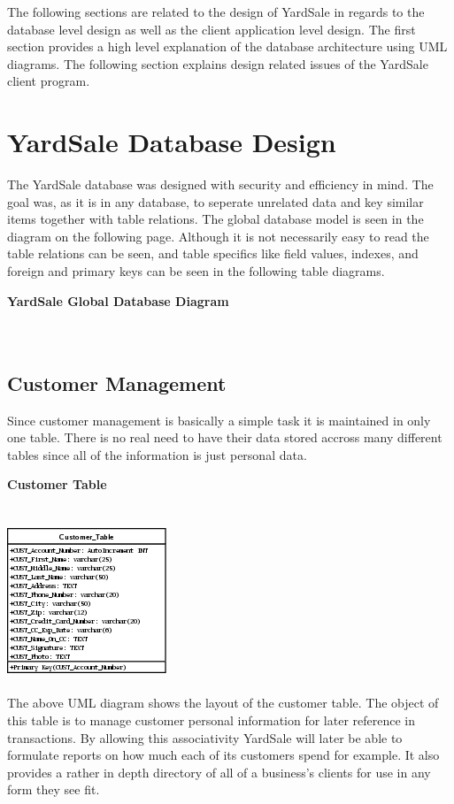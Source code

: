 \documentclass{report}
\begin{document}
	The following sections are related to the design of YardSale
	in regards to the database level design as well as the client
	application level design. The first section provides a high level
	explanation of the database architecture using UML diagrams. The
	following section explains design related issues of the YardSale
	client program.

\section{YardSale Database Design}

	The YardSale database was designed with security and efficiency in
	mind. The goal was, as it is in any database, to seperate unrelated
	data and key similar items together with table relations. The global
	database model is seen in the diagram on the following page. Although
	it is not necessarily easy to read the table relations can be seen, and
	table specifics like field values, indexes, and foreign and primary keys
	can be seen in the following table diagrams.

	\newpage

	{\bf YardSale Global Database Diagram}\\
	\\
	\\

	\newpage

	\subsection{Customer Management}

	Since customer management is basically a simple task it is maintained in only
	one table. There is no real need to have their data stored accross many
	different tables since all of the information is just personal data.

	{\bf Customer Table}\\
	\\
	\\
	\includegraphics{Tables/CustomerTable.png}\\
	\\
	The above UML diagram shows the layout of the customer table. The object of this
	table is to manage customer personal information for later reference in
	transactions. By allowing this associativity YardSale will later be able to
	formulate reports on how much each of its customers spend for example. It also
	provides a rather in depth directory of all of a business's clients for use
	in any form they see fit.
\end{document}
